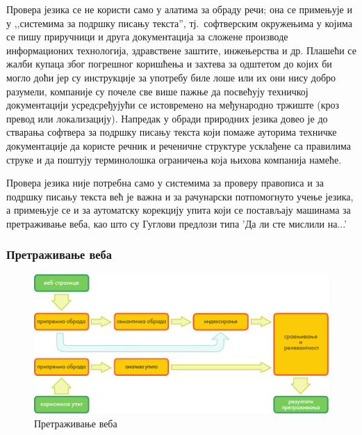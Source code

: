 \begin{multicols}{2}
Провера језика се не користи само у алатима за обраду речи; она се примењује и у ,,системима за подршку писању текста'', тј.~софтверским окружењима у којима се пишу приручници и друга документација за сложене производе информационих технологија, здравствене заштите, инжењерства и др. Плашећи се жалби купаца због погрешног коришћења и захтева за одштетом до којих би могло доћи јер су инструкције за употребу биле лоше или их они нису добро разумели, компаније су почеле све више пажње да посвећују техничкој документацији усредсређујући се истовремено на међународно тржиште (кроз превод или локализацију). Напредак у обради природних језика довео је до стварања софтвера за подршку писању текста који помаже ауторима техничке документације да користе речник и реченичне структуре усклађене са правилима струке и да поштују терминолошка ограничења која њихова компанија намеће. 

Провера језика није потребна само у системима за проверу правописа и за подршку писању текста већ је важна и за рачунарски потпомогнуто учење језика, а примењује се и  за аутоматску корекцију упита који се постављају машинама за претраживање веба, као што су Гуглови предлози типа 'Да ли сте мислили на...' 
 
 \subsubsection {Претраживање веба}


\begin{figure}[htb]
  \center
  \includegraphics[width=\textwidth]{../_media/serbian/web_search_architecture}
  \caption{Претраживање веба}
  \label{fig:websearcharch_sr}
\end{figure}


\end{multicols}
